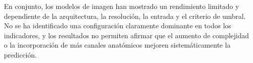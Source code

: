 En conjunto, los modelos de imagen han mostrado un rendimiento limitado y dependiente de la arquitectura, la resolución, la entrada y el criterio de umbral. No se ha identificado una configuración claramente dominante en todos los indicadores, y los resultados no permiten afirmar que el aumento de complejidad o la incorporación de más canales anatómicos mejoren sistemáticamente la predicción.









